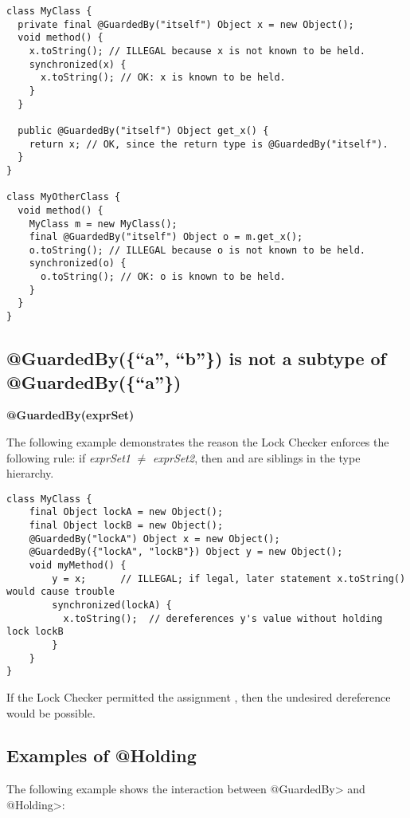 \begin{Verbatim}
class MyClass {
  private final @GuardedBy("itself") Object x = new Object();
  void method() {
    x.toString(); // ILLEGAL because x is not known to be held.
    synchronized(x) {
      x.toString(); // OK: x is known to be held.
    }
  }

  public @GuardedBy("itself") Object get_x() {
    return x; // OK, since the return type is @GuardedBy("itself").
  }
}

class MyOtherClass {
  void method() {
    MyClass m = new MyClass();
    final @GuardedBy("itself") Object o = m.get_x();
    o.toString(); // ILLEGAL because o is not known to be held.
    synchronized(o) {
      o.toString(); // OK: o is known to be held.
    }
  }
}
\end{Verbatim}


\subsection{@GuardedBy(\{``a'', ``b''\}) is not a subtype of @GuardedBy(\{``a''\})\label{lock-guardedby-invariant-subtyping}}


\textbf{@GuardedBy(exprSet)}

The following example demonstrates the reason the Lock Checker enforces the
following rule:  if \emph{exprSet1} $\neq$ \emph{exprSet2}, then
 and  are siblings in the type
hierarchy.

\begin{Verbatim}
class MyClass {
    final Object lockA = new Object();
    final Object lockB = new Object();
    @GuardedBy("lockA") Object x = new Object();
    @GuardedBy({"lockA", "lockB"}) Object y = new Object();
    void myMethod() {
        y = x;      // ILLEGAL; if legal, later statement x.toString() would cause trouble
        synchronized(lockA) {
          x.toString();  // dereferences y's value without holding lock lockB
        }
    }
}
\end{Verbatim}


If the Lock Checker permitted the assignment
, then the undesired dereference would be possible.


\subsection{Examples of @Holding\label{lock-examples-holding}}

The following example shows the interaction between \<@GuardedBy> and
\<@Holding>:

